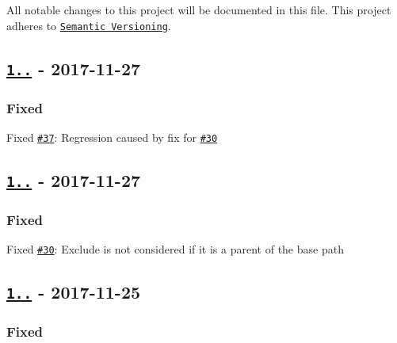 All notable changes to this project will be documented in this file. This project adheres to \href{http://semver.org/}{\tt Semantic Versioning}.

\subsection*{\href{https://github.com/sebastianbergmann/php-file-iterator/compare/1.4.4...1.4.5}{\tt 1..} -\/ 2017-\/11-\/27}

\subsubsection*{Fixed}


\begin{DoxyItemize}
\item Fixed \href{https://github.com/sebastianbergmann/php-file-iterator/issues/37}{\tt \#37}\+: Regression caused by fix for \href{https://github.com/sebastianbergmann/php-file-iterator/issues/30}{\tt \#30}
\end{DoxyItemize}

\subsection*{\href{https://github.com/sebastianbergmann/php-file-iterator/compare/1.4.3...1.4.4}{\tt 1..} -\/ 2017-\/11-\/27}

\subsubsection*{Fixed}


\begin{DoxyItemize}
\item Fixed \href{https://github.com/sebastianbergmann/php-file-iterator/issues/30}{\tt \#30}\+: Exclude is not considered if it is a parent of the base path
\end{DoxyItemize}

\subsection*{\href{https://github.com/sebastianbergmann/php-file-iterator/compare/1.4.2...1.4.3}{\tt 1..} -\/ 2017-\/11-\/25}

\subsubsection*{Fixed}


